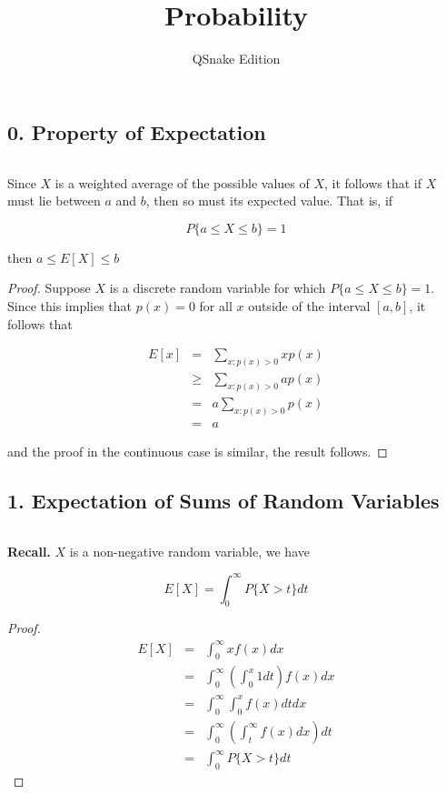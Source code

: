 


\title{Probability}

\author{QSnake Edition}

\maketitle

\subsection*{0. Property of Expectation}$ $

Since $X$ is a weighted average of the possible values of $X$, it follows that if $X$ must lie between $a$ and $b$, then so must its expected value. That is, if 

$$P\{a \leq X \leq b\} = 1$$

then $a \leq E[X] \leq b$

\begin{proof}
	Suppose $X$ is a discrete random variable for which $P\{a \leq X \leq b\} = 1$. Since this implies that $p(x) = 0$ for all $x$ outside of the interval $[a,b]$, it follows that
	
	\begin{eqnarray*}
		E[x] &=& \sum_{x:p(x)>0}xp(x) \\
		&\geq& \sum_{x:p(x)>0} ap(x) \\
		&=& a\sum_{x:p(x)>0} p(x) \\
		&=& a
	\end{eqnarray*}
	
	and the proof in the continuous case is similar, the result follows. 
\end{proof}

\subsection*{1. Expectation of Sums of Random Variables} $ $

\textbf{Recall.} $X$ is a non-negative random variable, we have

$$E[X] = \int^{\infty}_0 P\{X > t\}dt$$

\begin{proof}
	\begin{eqnarray*}
		E[X] &=& \int^{\infty}_0 xf(x)dx\\
		&=& \int^{\infty}_{0}\left(\int^x_0 1 dt \right)f(x)dx\\
		&=& \int^{\infty}_{0}\int^x_0 f(x) dt dx\\
		&=& \int^{\infty}_{0}\left(\int^{\infty}_{t}f(x)dx\right)dt\\
		&=& \int^{\infty}_{0}P\{X > t\}dt
	\end{eqnarray*}
\end{proof}

